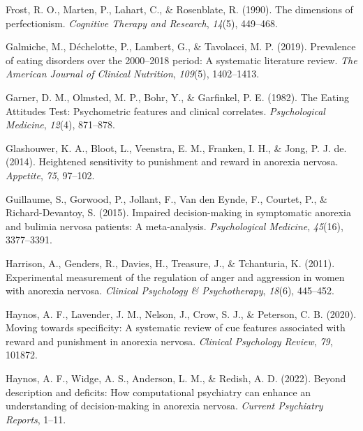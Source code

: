 \documentclass[
  man,floatsintext]{apa6}
\newlength{\cslhangindent}
\newlength{\cslentryspacingunit} %
\newenvironment{CSLReferences}[2] %
 {%
  \setlength{\parindent}{0pt}
  \ifodd #1
  \let\oldpar\par
  \def\par{\hangindent=\cslhangindent\oldpar}
  \fi
  \setlength{\parskip}{#2\cslentryspacingunit}
 }%
 {}
\begin{document}
\begin{CSLReferences}{1}{0}
\leavevmode{}%
Frost, R. O., Marten, P., Lahart, C., \& Rosenblate, R. (1990). The dimensions of perfectionism. \emph{Cognitive Therapy and Research}, \emph{14}(5), 449--468.

\leavevmode{}%
Galmiche, M., Déchelotte, P., Lambert, G., \& Tavolacci, M. P. (2019). Prevalence of eating disorders over the 2000--2018 period: A systematic literature review. \emph{The American Journal of Clinical Nutrition}, \emph{109}(5), 1402--1413.

\leavevmode{}%
Garner, D. M., Olmsted, M. P., Bohr, Y., \& Garfinkel, P. E. (1982). The {Eating} {Attitudes} {Test}: Psychometric features and clinical correlates. \emph{Psychological Medicine}, \emph{12}(4), 871--878.

\leavevmode{}%
Glashouwer, K. A., Bloot, L., Veenstra, E. M., Franken, I. H., \& Jong, P. J. de. (2014). Heightened sensitivity to punishment and reward in anorexia nervosa. \emph{Appetite}, \emph{75}, 97--102.

\leavevmode{}%
Guillaume, S., Gorwood, P., Jollant, F., Van den Eynde, F., Courtet, P., \& Richard-Devantoy, S. (2015). Impaired decision-making in symptomatic anorexia and bulimia nervosa patients: A meta-analysis. \emph{Psychological Medicine}, \emph{45}(16), 3377--3391.

\leavevmode{}%
Harrison, A., Genders, R., Davies, H., Treasure, J., \& Tchanturia, K. (2011). Experimental measurement of the regulation of anger and aggression in women with anorexia nervosa. \emph{Clinical Psychology \& Psychotherapy}, \emph{18}(6), 445--452.

\leavevmode{}%
Haynos, A. F., Lavender, J. M., Nelson, J., Crow, S. J., \& Peterson, C. B. (2020). Moving towards specificity: A systematic review of cue features associated with reward and punishment in anorexia nervosa. \emph{Clinical Psychology Review}, \emph{79}, 101872.

\leavevmode{}%
Haynos, A. F., Widge, A. S., Anderson, L. M., \& Redish, A. D. (2022). Beyond description and deficits: How computational psychiatry can enhance an understanding of decision-making in anorexia nervosa. \emph{Current Psychiatry Reports}, 1--11.


\end{CSLReferences}
\end{document}
